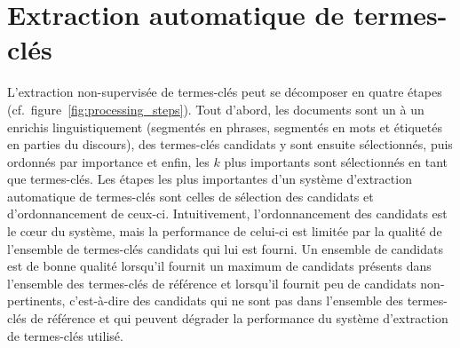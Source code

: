 \section{Extraction automatique de termes-clés}
\label{sec:extraction_automatique_de_termes_cles}
  L'extraction non-supervisée de termes-clés peut se décomposer en quatre étapes
  (cf.~figure~\ref{fig:processing_steps}). Tout d'abord, les documents sont un à
  un enrichis linguistiquement (segmentés en phrases, segmentés en mots et
  étiquetés en parties du discours), des termes-clés candidats y sont ensuite
  sélectionnés, puis ordonnés par importance et enfin, les $k$ plus importants
  sont sélectionnés en tant que termes-clés. Les étapes les plus importantes
  d'un système d'extraction automatique de termes-clés sont celles de sélection
  des candidats et d'ordonnancement de ceux-ci. Intuitivement, l'ordonnancement
  des candidats est le c\oe{}ur du système, mais la performance de celui-ci est
  limitée par la qualité de l'ensemble de termes-clés candidats qui lui est
  fourni. Un ensemble de candidats est de bonne qualité lorsqu'il fournit un
  maximum de candidats présents dans l'ensemble des termes-clés de référence et
  lorsqu'il fournit peu de candidats non-pertinents, c'est-à-dire des candidats
  qui ne sont pas dans l'ensemble des termes-clés de référence et qui peuvent
  dégrader la performance du système d'extraction de termes-clés utilisé.
